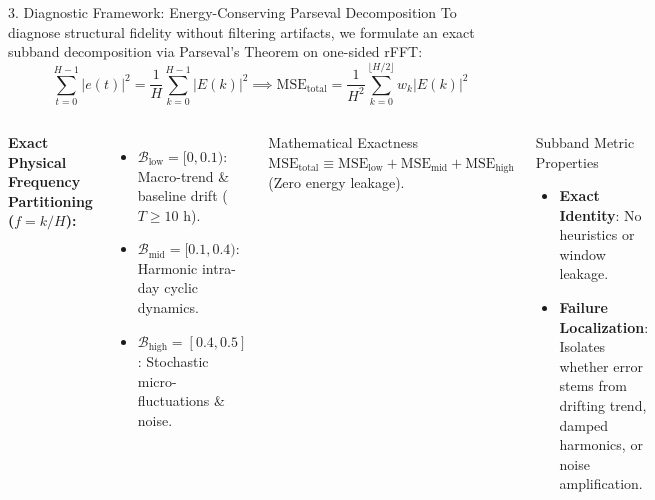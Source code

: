 \documentclass[aspectratio=169, 10pt]{beamer}
\begin{document}
\begin{frame}{3. Diagnostic Framework: Energy-Conserving Parseval Decomposition}
To diagnose structural fidelity without filtering artifacts, we formulate an exact subband decomposition via Parseval's Theorem on one-sided rFFT:
\begin{equation*}
    \sum_{t=0}^{H-1} |e(t)|^2 = \frac{1}{H} \sum_{k=0}^{H-1} |E(k)|^2 \implies \text{MSE}_{\text{total}} = \frac{1}{H^2} \sum_{k=0}^{\lfloor H/2 \rfloor} w_k |E(k)|^2
\end{equation*}

\vspace{0.2cm}
\begin{columns}[T]
\textbf{Exact Physical Frequency Partitioning ($f = k/H$):}
\begin{itemize}
    \item $\mathcal{B}_{\text{low}} = [0, 0.1)$: Macro-trend \& baseline drift ($T \ge 10\text{ h}$).
    \item $\mathcal{B}_{\text{mid}} = [0.1, 0.4)$: Harmonic intra-day cyclic dynamics.
    \item $\mathcal{B}_{\text{high}} = [0.4, 0.5]$: Stochastic micro-fluctuations \& noise.
\end{itemize}
\begin{block}{Mathematical Exactness}
$\text{MSE}_{\text{total}} \equiv \text{MSE}_{\text{low}} + \text{MSE}_{\text{mid}} + \text{MSE}_{\text{high}}$ (Zero energy leakage).
\end{block}

\begin{exampleblock}{Subband Metric Properties}
\begin{itemize}
    \item \textbf{Exact Identity}: No heuristics or window leakage.
    \item \textbf{Failure Localization}: Isolates whether error stems from drifting trend, damped harmonics, or noise amplification.
\end{itemize}
\end{exampleblock}
\end{columns}
\end{frame}
\end{document}
